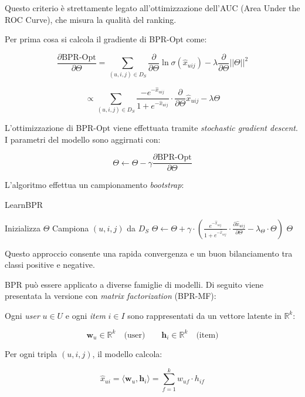 Questo criterio è strettamente legato all'ottimizzazione dell'AUC (Area Under the ROC Curve), che misura la qualità del ranking.

Per prima cosa si calcola il gradiente di BPR-Opt come:

\[
\frac{\partial \text{BPR-Opt}}{\partial \Theta} =
\sum_{(u,i,j) \in D_S} 
\frac{\partial}{\partial \Theta} \ln \sigma(\hat{x}_{uij}) - 
\lambda \frac{\partial}{\partial \Theta} ||\Theta||^2
\]

\[
\propto 
\sum_{(u,i,j) \in D_S} 
\frac{-e^{-\hat{x}_{uij}}}{1 + e^{-\hat{x}_{uij}}} 
\cdot \frac{\partial}{\partial \Theta} \hat{x}_{uij} 
- \lambda \Theta
\]

L'ottimizzazione di BPR-Opt viene effettuata tramite \textit{stochastic gradient descent}. I parametri del modello sono aggirnati con:

\[
\Theta \gets \Theta - \gamma \frac{\partial \text{BPR-Opt}}{\partial \Theta}
\]


L'algoritmo effettua un campionamento \textit{bootstrap}:

\begin{algorithm}[H]
\caption{LearnBPR}
\begin{algorithmic}[1]
    \State Inizializza $\Theta$
    \Repeat
        \State Campiona $(u, i, j)$ da $D_S$
        \State $\Theta \gets \Theta + \gamma \cdot \left( \frac{e^{-\hat{x}_{uij}}}{1 + e^{-\hat{x}_{uij}}} \cdot \frac{\partial \hat{x}_{uij}}{\partial \Theta} - \lambda_\Theta \cdot \Theta \right)$
    \State \Return $\Theta$
\EndProcedure
\end{algorithmic}
\end{algorithm}

Questo approccio consente una rapida convergenza e un buon bilanciamento tra classi positive e negative.

BPR può essere applicato a diverse famiglie di modelli. Di seguito viene presentata la versione con \textit{matrix factorization} (BPR-MF):

Ogni \textit{user} \( u \in U \) e ogni \textit{item} \( i \in I \) sono rappresentati da un vettore latente in \( \mathbb{R}^k \):

\[
\mathbf{w}_u \in \mathbb{R}^k \quad \text{(user)} \qquad
\mathbf{h}_i \in \mathbb{R}^k \quad \text{(item)}
\]


Per ogni tripla \( (u, i, j) \), il modello calcola:

\[
\hat{x}_{ui} = \langle \mathbf{w}_u, \mathbf{h}_i \rangle = \sum_{f=1}^{k} w_{uf} \cdot h_{if}
\]

